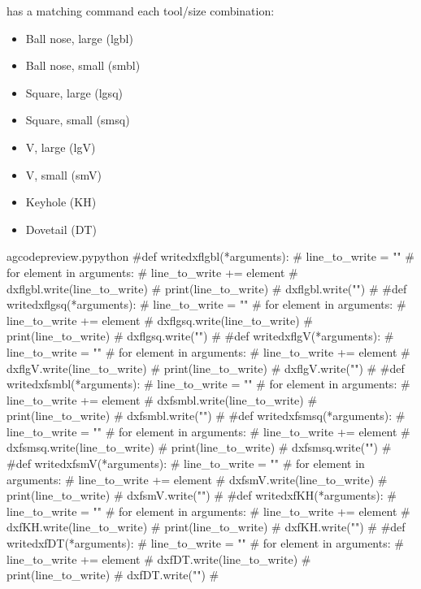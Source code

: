 \documentclass{ltxdoc}
\begin{document}
\noindent has a matching command each tool/size combination:

\begin{itemize}
\item Ball nose, large (lgbl) 
\item Ball nose, small (smbl) 
\item Square, large (lgsq) 
\item Square, small (smsq) 
\item V, large (lgV) 
\item V, small (smV) 
\item Keyhole (KH) 
\item Dovetail (DT) 
\end{itemize}
 
\lstset{firstnumber=\thegcpy}
\begin{writecode}{a}{gcodepreview.py}{python}
#def writedxflgbl(*arguments):
#    line_to_write = ""
#    for element in arguments:
#        line_to_write += element
#    dxflgbl.write(line_to_write)
#    print(line_to_write)
#    dxflgbl.write("\n")
#
#def writedxflgsq(*arguments):
#    line_to_write = ""
#    for element in arguments:
#        line_to_write += element
#    dxflgsq.write(line_to_write)
#    print(line_to_write)
#    dxflgsq.write("\n")
#
#def writedxflgV(*arguments):
#    line_to_write = ""
#    for element in arguments:
#        line_to_write += element
#    dxflgV.write(line_to_write)
#    print(line_to_write)
#    dxflgV.write("\n")
#
#def writedxfsmbl(*arguments):
#    line_to_write = ""
#    for element in arguments:
#        line_to_write += element
#    dxfsmbl.write(line_to_write)
#    print(line_to_write)
#    dxfsmbl.write("\n")
#
#def writedxfsmsq(*arguments):
#    line_to_write = ""
#    for element in arguments:
#        line_to_write += element
#    dxfsmsq.write(line_to_write)
#    print(line_to_write)
#    dxfsmsq.write("\n")
#
#def writedxfsmV(*arguments):
#    line_to_write = ""
#    for element in arguments:
#        line_to_write += element
#    dxfsmV.write(line_to_write)
#    print(line_to_write)
#    dxfsmV.write("\n")
#
#def writedxfKH(*arguments):
#    line_to_write = ""
#    for element in arguments:
#        line_to_write += element
#    dxfKH.write(line_to_write)
#    print(line_to_write)
#    dxfKH.write("\n")
#
#def writedxfDT(*arguments):
#    line_to_write = ""
#    for element in arguments:
#        line_to_write += element
#    dxfDT.write(line_to_write)
#    print(line_to_write)
#    dxfDT.write("\n")
#
\end{writecode}
\addtocounter{gcpy}{64}
%
 
\end{document}
